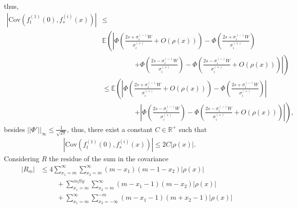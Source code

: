 \documentclass[12pt]{article}
\theoremstyle{Theorem}
\begin{document}
thus, 
{\small
\begin{align*}
 |\text{Cov}\left(f_{t}^{\scriptscriptstyle(1)}(0), f_{s}^{\scriptscriptstyle(i)}(x) \right)| & \leq \\
 &  \mathbb{E}\left(\left|\Phi\left(\frac{2s + \sigma^{\scriptscriptstyle (-)}_{i}W}{\sigma^{\scriptscriptstyle (+)}_{i}} + O(\rho(x)) \right)  - \Phi\left(\frac{2s + \sigma^{\scriptscriptstyle (-)}_{i}W}{\sigma^{\scriptscriptstyle (+)}_{i}} \right) \right. \right. \\
 & \hspace{2cm} \left. \left.+ \Phi\left(\frac{2s - \sigma^{\scriptscriptstyle (-)}_{i}W}{\sigma^{\scriptscriptstyle (+)}_{i}} \right) - \Phi\left(\frac{2s -\sigma^{\scriptscriptstyle (-)}_{i}W }{\sigma^{\scriptscriptstyle (+)}_{i}} + O(\rho(x))\right)\right|\right) \\
 & \leq \mathbb{E}\left(\left|\Phi\left(\frac{2s + \sigma^{\scriptscriptstyle (-)}_{i}W}{\sigma^{\scriptscriptstyle (+)}_{i}} + O(\rho(x)) \right)  - \Phi\left(\frac{2s + \sigma^{\scriptscriptstyle (-)}_{i}W}{\sigma^{\scriptscriptstyle (+)}_{i}} \right) \right| \right. \\
 & \hspace{2cm} \left. + \left| \Phi\left(\frac{2s - \sigma^{\scriptscriptstyle (-)}_{i}W}{\sigma^{\scriptscriptstyle (+)}_{i}} \right) - \Phi\left(\frac{2s -\sigma^{\scriptscriptstyle (-)}_{i}W }{\sigma^{\scriptscriptstyle (+)}_{i}} + O(\rho(x))\right)\right|\right),
 \end{align*}
besides $||\Phi'||_{\infty} \leq \frac{1}{\sqrt{2\pi}}$, thus, there exist a constant $C \in \mathbb{R}^{+}$ such that 
\begin{align*}
&  |\text{Cov}\left(f_{t}^{\scriptscriptstyle(1)}(0), f_{s}^{\scriptscriptstyle(i)}(x) \right)| \leq 2C|\rho(x)|. 
\end{align*}
Considering $R$ the residue of the sum in the covariance
\begin{align*}
|R_{m}| & \leq 4\sum_{x_{\scriptscriptstyle 1} = m}^{\infty}\sum_{x_{\scriptscriptstyle 2}= m}^{\infty}\left(m - x_{1}\right)\left(m - 1- x_{2}\right)|\rho(x)| \\
& \hspace{1cm}+ \sum_{x_1 = m}^{infty} \sum_{x_2=m}^{\infty}\left(m-x_1-1\right)\left(m-x_2\right)|\rho(x)| \\
& \hspace{1cm}+ \sum_{x_1 = m}^\infty \sum_{x_2= -\infty}^{\scriptscriptstyle -m}\left(m-x_1-1\right)\left(m+x_2-1\right)|\rho(x)|\\

\end{align*}}
\end{document}
